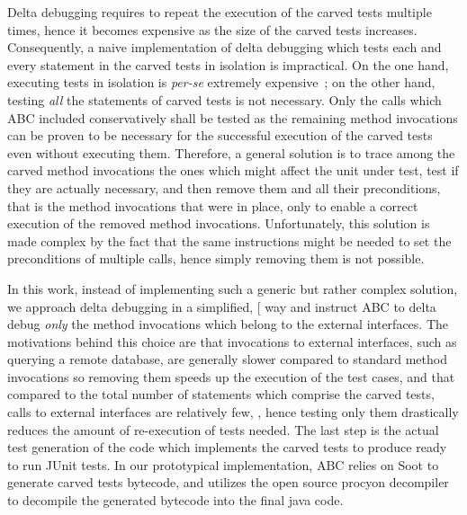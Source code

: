 \documentclass[10pt,conference]{IEEEtran}
\makeatletter
\gdef\xxx{\@ifnextchar[\xxx@lab\xxx@nolab}
\newcommand{\abc}{\textsf{ABC}\xspace}
\makeatother
\begin{document}
Delta debugging requires to repeat the execution of the carved tests multiple times, hence it becomes expensive as the size of the carved tests
increases. Consequently, a naive implementation of delta debugging which tests each and every statement in the carved tests in
isolation is impractical. On the one hand, executing tests in isolation is \emph{per-se} extremely expensive~\cite{jonbell:vmvm};
on the other hand, testing \emph{all} the statements of carved tests is not necessary. Only the calls which \abc included conservatively
shall be tested as the remaining method invocations can be proven to be necessary for the successful execution of the
carved tests even without executing them. Therefore, a general solution is to trace among the carved method invocations the ones which might affect
the unit under test, test if they are actually necessary, and then remove them and all their preconditions, that is the method invocations that
were in place, only to enable a correct execution of the removed method invocations. Unfortunately, this solution is made complex by the fact
that the same instructions might be needed to set the preconditions of multiple calls, hence simply removing them is not possible.

In this work, instead of implementing such a generic but rather complex solution, we approach delta debugging in a simplified, \xxx{yet effective} way
and instruct \abc to delta debug \emph{only} the method invocations which belong to the external interfaces.
The motivations behind this choice are that invocations to external interfaces, such as querying a
remote database, are generally slower compared to standard method invocations so removing them speeds up the execution of the
test cases, and that compared to the total number of statements which comprise the carved tests, calls to external interfaces are relatively few,
, hence testing only them drastically reduces the amount of re-execution of tests needed. 
%
%
%
%
%
%
The last step is the actual test generation of the code which implements the carved tests to produce
ready to run JUnit tests.
%
In our prototypical implementation, \abc relies on Soot to generate carved tests bytecode, 
and utilizes the open source procyon decompiler~\cite{}  to decompile the generated bytecode into the final java code.
\end{document}
